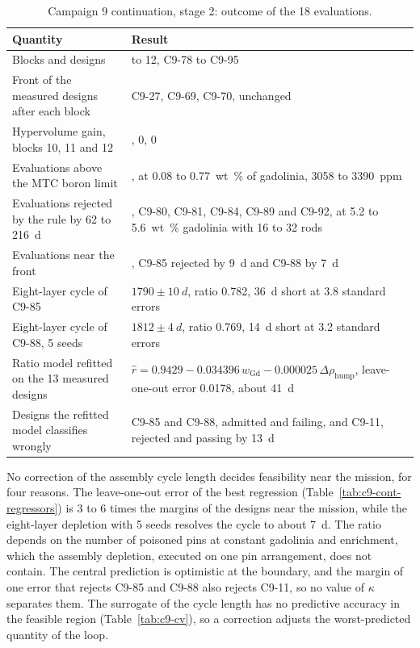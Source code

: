\begin{table}[htbp]
  \centering
  \small
  \caption{Campaign 9 continuation, stage 2: outcome of the 18 evaluations.}
  \label{tab:c9-cont-stage2}
  \begin{tabularx}{\textwidth}{@{}>{\raggedright\arraybackslash}p{}>{\raggedright\arraybackslash}X@{}}
    \toprule
    Quantity & Result \\
    \midrule
    Blocks and designs & 10 to 12, C9-78 to C9-95 \\
    Front of the measured designs after each block & C9-27, C9-69, C9-70, unchanged \\
    Hypervolume gain, blocks 10, 11 and 12 & 7, 0, 0 \\
    Evaluations above the MTC boron limit & 10, at 0.08 to \SI{0.77}{wt\%} of gadolinia, 3058 to \SI{3390}{ppm} \\
    Evaluations rejected by the rule by 62 to \SI{216}{d} & 5, C9-80, C9-81, C9-84, C9-89 and C9-92, at 5.2 to \SI{5.6}{wt\%} gadolinia with 16 to 32 rods \\
    Evaluations near the front & 2, C9-85 rejected by \SI{9}{d} and C9-88 by \SI{7}{d} \\
    Eight-layer cycle of C9-85 & $1790 \pm \SI{10}{d}$, ratio 0.782, \SI{36}{d} short at 3.8 standard errors \\
    Eight-layer cycle of C9-88, 5 seeds & $1812 \pm \SI{4}{d}$, ratio 0.769, \SI{14}{d} short at 3.2 standard errors \\
    Ratio model refitted on the 13 measured designs & $\hat{r} = 0.9429 - 0.034396\, w_\mathrm{Gd} - 0.000025\, \Delta\rho_\mathrm{hump}$, leave-one-out error 0.0178, about \SI{41}{d} \\
    Designs the refitted model classifies wrongly & C9-85 and C9-88, admitted and failing, and C9-11, rejected and passing by \SI{13}{d} \\
    \bottomrule
  \end{tabularx}
\end{table}

No correction of the assembly cycle length decides feasibility near
the mission, for four reasons. The leave-one-out error of the best
regression (Table~\ref{tab:c9-cont-regressors}) is 3 to 6 times the
margins of the designs near the mission, while the eight-layer depletion
with 5 seeds resolves the cycle to about \SI{7}{d}. The ratio depends on
the number of poisoned pins at constant gadolinia and enrichment, which
the assembly depletion, executed on one pin arrangement, does not
contain. The central prediction is optimistic at the boundary, and the
margin of one error that rejects C9-85 and C9-88 also rejects C9-11, so
no value of $\kappa$ separates them. The surrogate of the cycle length
has no predictive accuracy in the feasible region
(Table~\ref{tab:c9-cv}), so a correction adjusts the worst-predicted
quantity of the loop.

